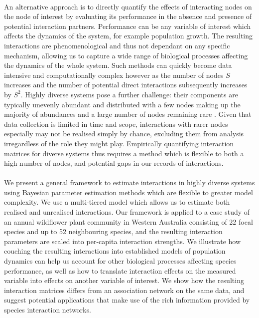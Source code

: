 \documentclass[a4,12pt]{article}
\begin{document}
    \paragraph{}
    An alternative approach is to directly quantify the effects of interacting nodes on the node of interest by evaluating its performance in the absence and presence of potential interaction partners. Performance can be any variable of interest which affects the dynamics of the system, for example population growth. The resulting interactions are phenomenological and thus not dependant on any specific mechanism, allowing us to capture a wide range of biological processes affecting the dynamics of the whole system. Such methods can quickly become data intensive and computationally complex however as the number of nodes $S$ increases and the number of potential direct interactions subsequently increases by $S^2$. Highly diverse systems pose a further challenge: their components are typically unevenly abundant and distributed with a few nodes making up the majority of abundances and a large number of nodes remaining rare \parencite{}. Given that data collection is limited in time and scope, interactions with rarer nodes especially may not be realised simply by chance, excluding them from analysis irregardless of the role they might play. Empirically quantifying interaction matrices for diverse systems thus requires a method which is flexible to both a high number of nodes, and potential gaps in our records of interactions. 


    \paragraph{} %
    We present a general framework to estimate interactions in highly diverse systems using Bayesian parameter estimation methods which are flexible to greater model complexity. We use a multi-tiered model which allows us to estimate both realised and unrealised interactions. Our framework is applied to a case study of an annual wildflower plant community in Western Australia consisting of 22 focal species and up to 52 neighbouring species, and the resulting interaction parameters are scaled into per-capita interaction strengths. We illustrate how couching the resulting interactions into established models of population dynamics can help us account for other biological processes affecting species performance, as well as how to translate interaction effects on the measured variable into effects on another variable of interest. We show how the resulting interaction matrices differs from an association network on the same data, and suggest potential applications that make use of the rich information provided by species interaction networks.
\end{document}
